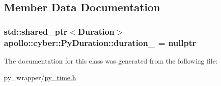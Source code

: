 \subsection{Member Data Documentation}
\hypertarget{classapollo_1_1cyber_1_1PyDuration_a842d5b66f4981d02ad53f4e869b4adef}{
\subsubsection[{duration\-\_\-}]{\setlength{\rightskip}{0pt plus 5cm}std\-::shared\-\_\-ptr$<${\bf Duration}$>$ apollo\-::cyber\-::\-Py\-Duration\-::duration\-\_\- = nullptr\hspace{0.3cm}{\ttfamily [private]}}}\label{classapollo_1_1cyber_1_1PyDuration_a842d5b66f4981d02ad53f4e869b4adef}


The documentation for this class was generated from the following file\-:\begin{DoxyCompactItemize}
\item 
py\-\_\-wrapper/\hyperlink{py__time_8h}{py\-\_\-time.\-h}\end{DoxyCompactItemize}
